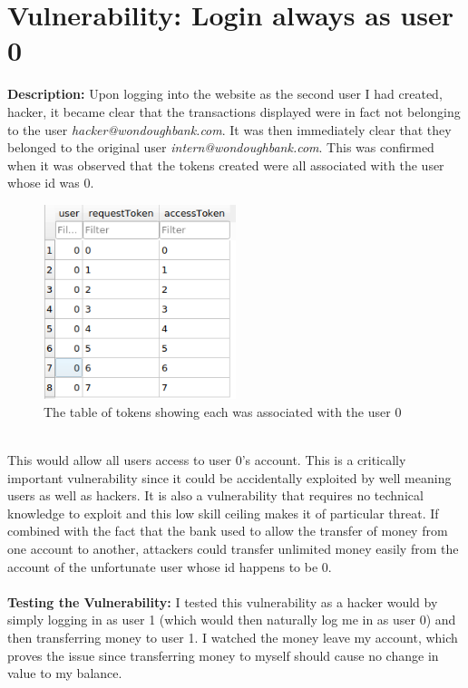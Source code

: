 \section{Vulnerability: Login always as user 0}
\label{sec:background}
\textbf{Description:} Upon logging into the website as the second user I had created, hacker, it became clear that the transactions displayed were in fact
not belonging to the user \textit{hacker@wondoughbank.com}. It was then immediately clear that they belonged to the original user \textit{intern@wondoughbank.com}. This was confirmed
when it was observed that the tokens created were all associated with the user whose id was 0.
\begin{figure}[h]
   \centering
   \includegraphics[width=0.5\textwidth]{figs/token1.png}
   \caption{The table of tokens showing each was associated with the user 0}
   \label{figvun6a}
 \end{figure}\\
This would allow all users access to user 0's account. This is a critically important vulnerability since it could be accidentally exploited by well meaning users as well as hackers.
It is also a vulnerability that requires no technical knowledge to exploit and this low skill ceiling makes it of particular threat. If combined with the fact that the bank used
to allow the transfer of money from one account to another, attackers could transfer unlimited money easily from the account of the unfortunate user whose id happens to be 0.\\ \\
\textbf{Testing the Vulnerability:} I tested this vulnerability as a hacker would by simply logging in as user 1 (which would then naturally log me in as user 0) and then
transferring money to user 1. I watched the money leave my account, which proves the issue since transferring money to myself should cause no change in value to my balance.
